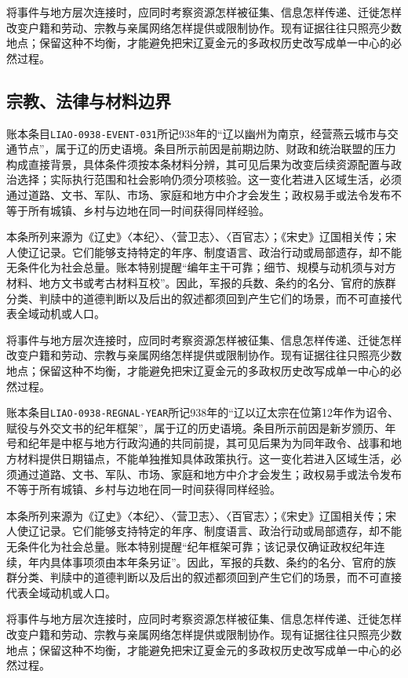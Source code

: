 将事件与地方层次连接时，应同时考察资源怎样被征集、信息怎样传递、迁徙怎样改变户籍和劳动、宗教与亲属网络怎样提供或限制协作。现有证据往往只照亮少数地点；保留这种不均衡，才能避免把宋辽夏金元的多政权历史改写成单一中心的必然过程。

\subsection{宗教、法律与材料边界}

账本条目\texttt{LIAO-0938-EVENT-031}所记938年的“辽以幽州为南京，经营燕云城市与交通节点”，属于辽的历史语境。条目所示前因是前期边防、财政和统治联盟的压力构成直接背景，具体条件须按本条材料分辨，其可见后果为改变后续资源配置与政治选择；实际执行范围和社会影响仍须分项核验。这一变化若进入区域生活，必须通过道路、文书、军队、市场、家庭和地方中介才会发生；政权易手或法令发布不等于所有城镇、乡村与边地在同一时间获得同样经验。

本条所列来源为《辽史》〈本纪〉、〈营卫志〉、〈百官志〉；《宋史》辽国相关传；宋人使辽记录。它们能够支持特定的年序、制度语言、政治行动或局部遗存，却不能无条件化为社会总量。账本特别提醒“编年主干可靠；细节、规模与动机须与对方材料、地方文书或考古材料互校”。因此，军报的兵数、条约的名分、官府的族群分类、判牍中的道德判断以及后出的叙述都须回到产生它们的场景，而不可直接代表全域动机或人口。

将事件与地方层次连接时，应同时考察资源怎样被征集、信息怎样传递、迁徙怎样改变户籍和劳动、宗教与亲属网络怎样提供或限制协作。现有证据往往只照亮少数地点；保留这种不均衡，才能避免把宋辽夏金元的多政权历史改写成单一中心的必然过程。

账本条目\texttt{LIAO-0938-REGNAL-YEAR}所记938年的“辽以辽太宗在位第12年作为诏令、赋役与外交文书的纪年框架”，属于辽的历史语境。条目所示前因是新岁颁历、年号和纪年是中枢与地方行政沟通的共同前提，其可见后果为为同年政令、战事和地方材料提供日期锚点，不能单独推知具体政策执行。这一变化若进入区域生活，必须通过道路、文书、军队、市场、家庭和地方中介才会发生；政权易手或法令发布不等于所有城镇、乡村与边地在同一时间获得同样经验。

本条所列来源为《辽史》〈本纪〉、〈营卫志〉、〈百官志〉；《宋史》辽国相关传；宋人使辽记录。它们能够支持特定的年序、制度语言、政治行动或局部遗存，却不能无条件化为社会总量。账本特别提醒“纪年框架可靠；该记录仅确证政权纪年连续，年内具体事项须由本年条另证”。因此，军报的兵数、条约的名分、官府的族群分类、判牍中的道德判断以及后出的叙述都须回到产生它们的场景，而不可直接代表全域动机或人口。

将事件与地方层次连接时，应同时考察资源怎样被征集、信息怎样传递、迁徙怎样改变户籍和劳动、宗教与亲属网络怎样提供或限制协作。现有证据往往只照亮少数地点；保留这种不均衡，才能避免把宋辽夏金元的多政权历史改写成单一中心的必然过程。

